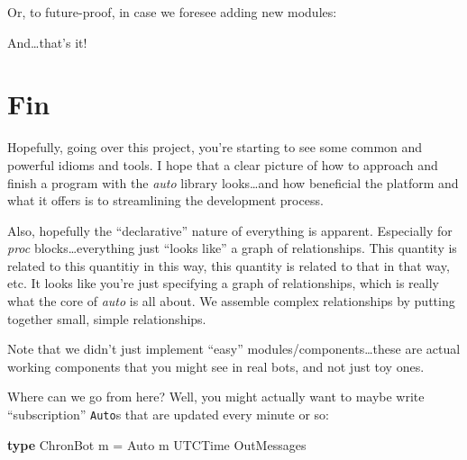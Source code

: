\documentclass[]{article}
\newenvironment{Shaded}{}{}
\newcommand{\KeywordTok}[1]{\textcolor[rgb]{0.00,0.44,0.13}{\textbf{{#1}}}}
\newcommand{\DataTypeTok}[1]{\textcolor[rgb]{0.56,0.13,0.00}{{#1}}}
\newcommand{\StringTok}[1]{\textcolor[rgb]{0.25,0.44,0.63}{{#1}}}
\newcommand{\OtherTok}[1]{\textcolor[rgb]{0.00,0.44,0.13}{{#1}}}
\newcommand{\FunctionTok}[1]{\textcolor[rgb]{0.02,0.16,0.49}{{#1}}}
\newcommand{\NormalTok}[1]{{#1}}
\begin{document}
Or, to future-proof, in case we foresee adding new modules:

\begin{Shaded}
\end{Shaded}

And\ldots{}that's it!

\section{Fin}\label{fin}

Hopefully, going over this project, you're starting to see some common
and powerful idioms and tools. I hope that a clear picture of how to
approach and finish a program with the \emph{auto} library
looks\ldots{}and how beneficial the platform and what it offers is to
streamlining the development process.

Also, hopefully the ``declarative'' nature of everything is apparent.
Especially for \emph{proc} blocks\ldots{}everything just ``looks like''
a graph of relationships. This quantity is related to this quantitiy in
this way, this quantity is related to that in that way, etc. It looks
like you're just specifying a graph of relationships, which is really
what the core of \emph{auto} is all about. We assemble complex
relationships by putting together small, simple relationships.

Note that we didn't just implement ``easy''
modules/components\ldots{}these are actual working components that you
might see in real bots, and not just toy ones.

Where can we go from here? Well, you might actually want to maybe write
``subscription'' \texttt{Auto}s that are updated every minute or so:

\begin{Shaded}
\begin{Highlighting}[]
\KeywordTok{type} \DataTypeTok{ChronBot} \NormalTok{m }\FunctionTok{=} \DataTypeTok{Auto} \NormalTok{m }\DataTypeTok{UTCTime} \DataTypeTok{OutMessages}
\end{Highlighting}
\end{Shaded}
\end{document}
